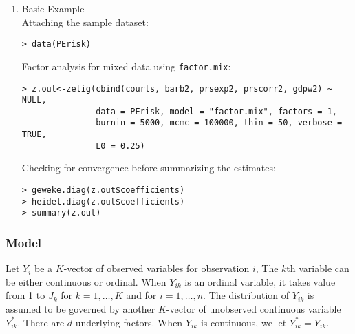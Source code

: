 \begin{enumerate}
\item {Basic Example} \\
Attaching the sample  dataset:
\begin{verbatim}
> data(PErisk)
\end{verbatim}
Factor analysis for mixed data using \texttt{factor.mix}:
\begin{verbatim}
> z.out<-zelig(cbind(courts, barb2, prsexp2, prscorr2, gdpw2) ~ NULL, 
               data = PErisk, model = "factor.mix", factors = 1,  
               burnin = 5000, mcmc = 100000, thin = 50, verbose = TRUE, 
               L0 = 0.25)
\end{verbatim}
Checking for convergence before summarizing the estimates:
\begin{verbatim}
> geweke.diag(z.out$coefficients)
> heidel.diag(z.out$coefficients)
> summary(z.out)
\end{verbatim}

\end{enumerate}

\subsubsection{Model}

Let $Y_i$ be a $K$-vector of observed variables for observation $i$, 
The $k$th variable can be either continuous or ordinal. When $Y_{ik}$ is an
ordinal variable, it takes value from 1 to $J_k$ for $k=1,\ldots, K$ and for 
$i =1, \ldots, n$. The distribution of $Y_{ik}$ is assumed to be 
governed by another $K$-vector of unobserved continuous variable $Y_{ik}^*$. 
There are $d$ underlying factors. When $Y_{ik}$ is continuous, we let 
$Y_{ik}^*=Y_{ik}$.

